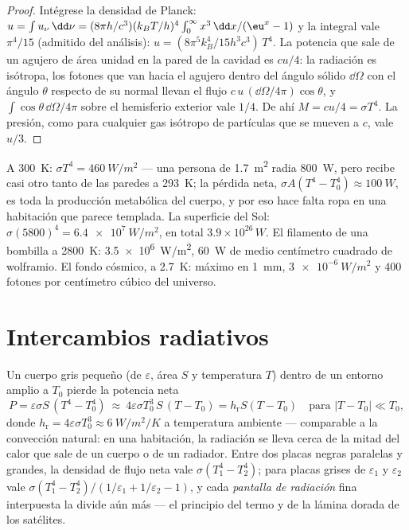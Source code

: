 \begin{proof}
Intégrese la densidad de Planck: $u = \int u_\nu\,\dd\nu = (8\pi h/c^3)(k_BT/h)^4
\int_0^\infty x^3\,\dd x/(\eu^x - 1)$ y la integral vale $\pi^4/15$
(admitido del análisis): $u = (8\pi^5k_B^4/15h^3c^3)\,T^4$. La potencia
que sale de un agujero de área unidad en la pared de la cavidad es $cu/4$: la
radiación es isótropa, los fotones que van hacia el agujero dentro del
ángulo sólido $\dd\Omega$ con el ángulo $\theta$ respecto de su normal llevan el
flujo $c\,u\,(\dd\Omega/4\pi)\cos\theta$, y $\int\cos\theta\,\dd\Omega/4\pi$
sobre el hemisferio exterior vale $1/4$. De ahí $M = cu/4 = \sigma T^4$.
La presión, como para cualquier gas isótropo de partículas que se mueven a $c$, vale
$u/3$.
\end{proof}

\begin{example}\label{ex:b2:thermal-radiation:orders}
A \qty{300}{K}: $\sigma T^4 = \qty{460}{W/m^2}$ --- una persona de
\qty{1.7}{m^2} radia \qty{800}{W}, pero recibe casi otro tanto de
las paredes a \qty{293}{K}; la pérdida neta, $\sigma A(T^4 - T_0^4) \approx
\qty{100}{W}$, es toda la producción metabólica del cuerpo, y por eso hace falta
ropa en una habitación que parece templada. La superficie del Sol: $\sigma
(5800)^4 = \qty{6.4e7}{W/m^2}$, en total $3.9 \times 10^{26}\,\unit{W}$. El
filamento de una bombilla a \qty{2800}{K}: \qty{3.5e6}{W/m^2}, \qty{60}{W} de medio
centímetro cuadrado de wolframio. El fondo cósmico, a \qty{2.7}{K}:
máximo en \qty{1}{mm}, $\qty{3e-6}{W/m^2}$ y $400$ fotones por centímetro
cúbico del universo.
\end{example}

\section{Intercambios radiativos}

\begin{proposition}\label{prop:b2:thermal-radiation:exchange}
Un cuerpo gris pequeño (de  $\varepsilon$, área $S$ y temperatura $T$)
dentro de un entorno amplio a $T_0$ pierde la potencia neta
\[
P = \varepsilon\sigma S\,(T^4 - T_0^4)
\ \approx\ 4\varepsilon\sigma T_0^3\,S\,(T - T_0) = h_{\text{r}}S(T - T_0)
\quad\text{para } |T - T_0| \ll T_0 ,
\]
donde $h_{\text{r}} = 4\varepsilon\sigma T_0^3 \approx \qty{6}{W/m^2/K}$ a
temperatura ambiente --- comparable a la convección natural: en una habitación,
la radiación se lleva cerca de la mitad del calor que sale de un cuerpo o de un radiador.
Entre dos placas negras paralelas y grandes, la densidad de flujo neta vale
$\sigma(T_1^4 - T_2^4)$; para placas grises de  $\varepsilon_1$ y
$\varepsilon_2$ vale $\sigma(T_1^4 - T_2^4)/(1/\varepsilon_1 + 1/\varepsilon_2
- 1)$, y cada \emph{pantalla de radiación} fina interpuesta la divide
aún más --- el principio del termo y de la lámina dorada de los
satélites.
\end{proposition}

